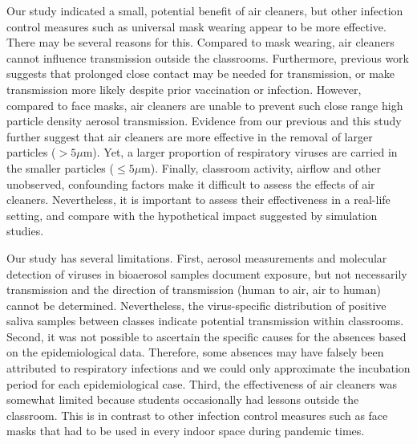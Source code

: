 \documentclass[fleqn,11pt]{wlscirep}
\begin{document}

Our study indicated a small, potential benefit of air cleaners, but other infection control measures such as universal mask wearing appear to be more effective\cite{Banholzer2023PLoSMed,Heinsohn2022,Gettings2021,Dharmadhikari2012AJRCCM,Leung2020NatMed,Milton2013PLoSPathogens}. There may be several reasons for this. Compared to \eg mask wearing, air cleaners cannot influence transmission outside the classrooms. Furthermore, previous work suggests that prolonged close contact may be needed for transmission\cite{Leung2020NatMed,Brankston2007LancetID}, or make transmission more likely despite prior vaccination or infection\cite{Lind2023NatCommun}. However, compared to face masks, air cleaners are unable to prevent such close range high particle density aerosol transmission. Evidence from our previous\cite{Banholzer2023PLoSMed} and this study further suggest that air cleaners are more effective in the removal of larger particles ($>5\mu$m). Yet, a larger proportion of respiratory viruses are carried in the smaller particles ($\leq5\mu$m)\cite{Fennelly2020}. Finally, classroom activity, airflow and other unobserved, confounding factors make it difficult to assess the effects of air cleaners. Nevertheless, it is important to assess their effectiveness in a real-life setting, and compare with the hypothetical impact suggested by simulation studies\cite{Lindsley2021,Cortellessa2023Build}.



Our study has several limitations. First, aerosol measurements and molecular detection of viruses in bioaerosol samples document exposure, but not necessarily transmission and the direction of transmission (human to air, air to human) cannot be determined. Nevertheless, the virus-specific distribution of positive saliva samples between classes indicate potential transmission within classrooms. Second, it was not possible to ascertain the specific causes for the absences based on the epidemiological data. Therefore, some absences may have falsely been attributed to respiratory infections and we could only approximate the incubation period for each epidemiological case. Third, the effectiveness of air cleaners was somewhat limited because students occasionally had lessons outside the classroom. This is in contrast to other infection control measures such as face masks that had to be used in every indoor space during pandemic times.

\end{document}
